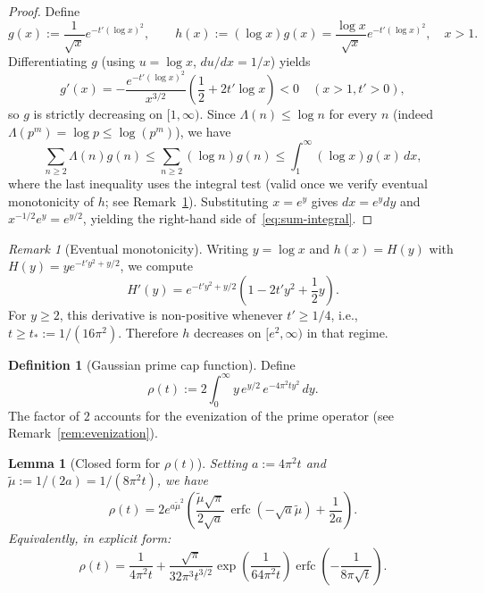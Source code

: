 \documentclass[11pt,a4paper]{article}
\newtheorem{lemma}[theorem]{Lemma}
\theoremstyle{definition}
\newtheorem{definition}[theorem]{Definition}
\theoremstyle{remark}
\newtheorem{remark}[theorem]{Remark}
\DeclareMathOperator{\erfc}{erfc}
\begin{document}
\begin{proof}
Define
\[
  g(x) := \frac{1}{\sqrt{x}} e^{-t'(\log x)^2}, \qquad
  h(x) := (\log x) g(x) = \frac{\log x}{\sqrt{x}} e^{-t'(\log x)^2}, \quad x > 1.
\]
Differentiating $g$ (using $u = \log x$, $du/dx = 1/x$) yields
\[
  g'(x) = -\frac{e^{-t'(\log x)^2}}{x^{3/2}} \left( \frac{1}{2} + 2t' \log x \right) < 0 \quad (x > 1, t' > 0),
\]
so $g$ is strictly decreasing on $[1, \infty)$. Since $\Lambda(n) \leq \log n$ for every $n$ (indeed $\Lambda(p^m) = \log p \leq \log(p^m)$), we have
\[
  \sum_{n \geq 2} \Lambda(n) g(n) \leq \sum_{n \geq 2} (\log n) g(n) \leq \int_1^{\infty} (\log x) g(x)\, dx,
\]
where the last inequality uses the integral test (valid once we verify eventual monotonicity of $h$; see Remark~\ref{rem:eventual-monotone-2}). Substituting $x = e^y$ gives $dx = e^y dy$ and $x^{-1/2} e^y = e^{y/2}$, yielding the right-hand side of~\eqref{eq:sum-integral}.
\end{proof}

\begin{remark}[Eventual monotonicity]\label{rem:eventual-monotone-2}
Writing $y = \log x$ and $h(x) = H(y)$ with $H(y) = y e^{-t' y^2 + y/2}$, we compute
\[
  H'(y) = e^{-t' y^2 + y/2} \left( 1 - 2t' y^2 + \frac{1}{2} y \right).
\]
For $y \geq 2$, this derivative is non-positive whenever $t' \geq 1/4$, i.e., $t \geq t_* := 1/(16\pi^2)$. Therefore $h$ decreases on $[e^2, \infty)$ in that regime.
\end{remark}

\begin{definition}[Gaussian prime cap function]\label{def:rho-t}
Define
\begin{equation}\label{eq:rho-def}
  \rho(t) := 2 \int_0^{\infty} y \, e^{y/2} \, e^{-4\pi^2 t y^2}\, dy.
\end{equation}
The factor of $2$ accounts for the evenization of the prime operator (see Remark~\ref{rem:evenization}).
\end{definition}

\begin{lemma}[Closed form for $\rho(t)$]\label{lem:rho-closed}
Setting $a := 4\pi^2 t$ and $\tilde{\mu} := 1/(2a) = 1/(8\pi^2 t)$, we have
\begin{equation}\label{eq:rho-closed}
  \rho(t) = 2 e^{a \tilde{\mu}^2} \left( \frac{\tilde{\mu} \sqrt{\pi}}{2\sqrt{a}} \, \erfc\left( -\sqrt{a} \tilde{\mu} \right) + \frac{1}{2a} \right).
\end{equation}
Equivalently, in explicit form:
\begin{equation}\label{eq:rho-explicit}
  \rho(t) = \frac{1}{4\pi^2 t} + \frac{\sqrt{\pi}}{32\pi^3 t^{3/2}} \exp\left( \frac{1}{64\pi^2 t} \right) \erfc\left( -\frac{1}{8\pi\sqrt{t}} \right).
\end{equation}
\end{lemma}
\end{document}
